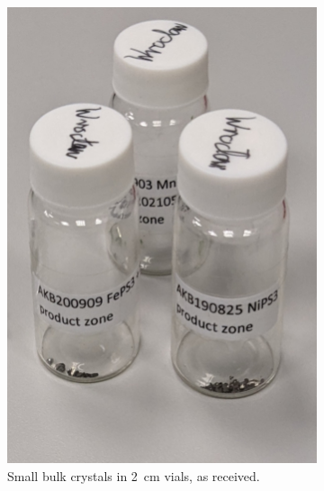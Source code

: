 \documentclass[
	twoside,
	parskip=half,
	a4paper,
]{scrbook}
\begin{document}
\begin{figure}
	\centering
	\begin{subfigure}[t]{.24\textwidth}
		\vskip 0pt
		\includegraphics[width=\textwidth]{../../photos/bulk_sample.jpg}
		\caption{Small bulk crystals in \SI{2}{cm} vials, as received.}
		\label{fig:samples_vials}
	\end{subfigure}
	\begin{subfigure}[t]{.24\textwidth}
		\vskip 0pt

\end{subfigure}
\end{figure}
\end{document}
